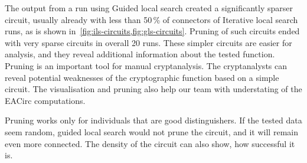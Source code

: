 \documentclass[
  print, %
  Table,   %
  nolof,     %
  nolot,     %
  11pt, %
  oneside  %
]{fithesis3}
\begin{document}
The output from a run using Guided local search created a significantly sparser circuit, usually already with less than 50\,\% of connectors of Iterative local search runs, as is shown in~\cref{fig:ils-circuits,fig:gls-circuits}. Pruning of such circuits ended with very sparse circuits in overall 20 runs. These simpler circuits are easier for analysis, and they reveal additional information about the tested function. Pruning is an important tool for manual cryptanalysis. The cryptanalysts can reveal potential weaknesses of the cryptographic function based on a simple circuit. The visualisation and pruning also help our team with understating of the EACirc computations.

Pruning works only for individuals that are good distinguishers. If the tested data seem random, guided local search would not prune the circuit, and it will remain even more connected. The density of the circuit can also show, how successful it is.
\end{document}

